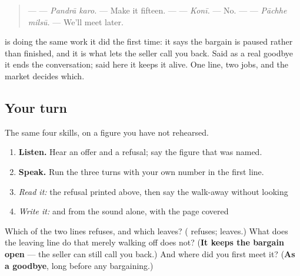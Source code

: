 \begin{quote}
— \textbf{ } — \emph{Pandrā karo.} — Make it fifteen. — \textbf{} — \emph{Konī.} — No. — \textbf{ } — \emph{Pāchhe milsū.} — We'll meet later.
\end{quote}

\textbf{ } is doing the same work it did the first time: it says the bargain is paused rather than finished, and it is what lets the seller call you back. Said as a real goodbye it ends the conversation; said here it keeps it alive. One line, two jobs, and the market decides which.

\subsection*{Your turn}
The same four skills, on a figure you have not rehearsed.

\begin{enumerate}
\raggedright
  \item \textbf{Listen.} Hear an offer and a refusal; say the figure that was named.
  \item \textbf{Speak.} Run the three turns with your own number in the first line.
  \item \emph{Read it:} the refusal printed above, then say the walk-away without looking
  \item \emph{Write it:} \textbf{} and \textbf{ } from the sound alone, with the page covered
\end{enumerate}

\begin{tcolorbox}[breakable,colback=teal!4,colframe=teal!35!black,title={Before you move on}]
Which of the two lines refuses, and which leaves? (\textbf{} refuses; \textbf{ } leaves.) What does the leaving line do that merely walking off does not? (\textbf{It keeps the bargain open} — the seller can still call you back.) And where did you first meet it? (\textbf{As a goodbye}, long before any bargaining.)
\end{tcolorbox}
